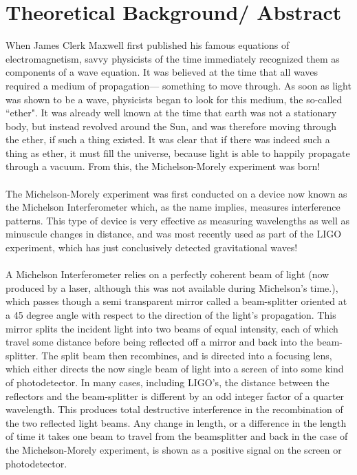\documentclass{amsart}
\begin{document}
\section{Theoretical Background/ Abstract}
When James Clerk Maxwell first published his famous equations of electromagnetism, savvy physicists of the time immediately recognized them as components of a wave equation. It was believed at the time that all waves required a medium of propagation\---- something to move through. As soon as light was shown to be a wave, physicists began to look for this medium, the so-called ``ether". It was already well known at the time that earth was not a stationary body, but instead revolved around the Sun, and was therefore moving through the ether, if such a thing existed. It was clear that if there was indeed such a thing as ether, it must fill the universe, because light is able to happily propagate through a vacuum. From this, the Michelson-Morely experiment was born! \\ \\
The Michelson-Morely experiment was first conducted on a device now known as the Michelson Interferometer which, as the name implies, measures interference patterns. This type of device is very effective as measuring wavelengths as well as minuscule changes in distance, and was most recently used as part of the LIGO experiment, which has just conclusively detected gravitational waves! \\ \\
A Michelson Interferometer relies on a perfectly coherent beam of light (now produced by a laser, although this was not available during Michelson's time.), which passes though a semi transparent mirror called a beam-splitter oriented at a 45 degree angle with respect to the direction of the light's propagation. This mirror splits the incident light into two beams of equal intensity, each of which travel some distance before being reflected off a mirror and back into the beam-splitter. The split beam then recombines, and is directed into a focusing lens, which either directs the now single beam of light into a screen of into some kind of photodetector. In many cases, including LIGO's, the distance between the reflectors and the beam-splitter is different by an odd integer factor of a quarter wavelength. This produces total destructive interference in the recombination of the two reflected light beams. Any change in length, or a difference in the length of time it takes one beam to travel from the beamsplitter and back in the case of the Michelson-Morely experiment, is shown as a positive signal on the screen or photodetector. \\
\end{document}
